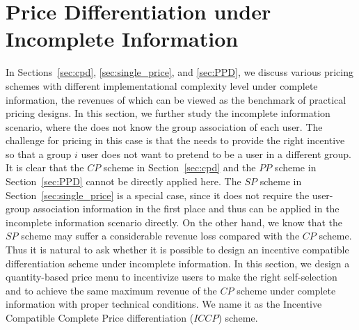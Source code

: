 \documentclass[twocolumn,10pt,twosided]{IEEEtran}
\begin{document}
\section{Price Differentiation under Incomplete Information}
\label{sec:incomplete_information}
In Sections~\ref{sec:cpd}, \ref{sec:single_price}, and \ref{sec:PPD},
we discuss various pricing schemes with different implementational complexity level under complete information, the revenues of  which can be viewed as the benchmark of practical pricing designs. In this section, we further study the incomplete information scenario, where the  does not know the group association of each user. The challenge for pricing in this case is that the  needs to provide the right incentive so that a group $i$ user does not want to pretend to be a user in a different group. It is clear that the $CP$ scheme in Section~\ref{sec:cpd} and the $PP$ scheme in Section~\ref{sec:PPD} cannot be directly applied here. The $SP$ scheme in Section~\ref{sec:single_price} is a special case, since it does not require the user-group association information in the first place and thus can be applied in the incomplete information scenario directly. On the other hand, we know that the $SP$ scheme may suffer a considerable revenue loss compared with the $CP$ scheme. Thus it is natural to ask whether it is possible to design an incentive compatible differentiation scheme under incomplete information.
In this section, we design a quantity-based price menu to incentivize users to make the right self-selection and to achieve the same maximum revenue of the $CP$ scheme under complete information with proper technical conditions.  We name it as the Incentive Compatible Complete Price differentiation ($ICCP$) scheme.
\end{document}
